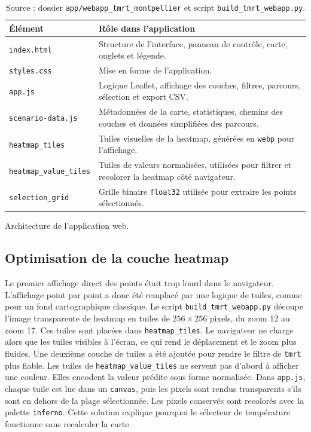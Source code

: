 \documentclass{article}
\begin{document}
\begin{table}[H]
\centering
\small
\begin{tabularx}{\textwidth}{p{}Y}
\toprule
Élément & Rôle dans l'application \\
\midrule
\texttt{index.html} & Structure de l'interface, panneau de contrôle, carte, onglets et légende. \\
\texttt{styles.css} & Mise en forme de l'application. \\
\texttt{app.js} & Logique Leaflet, affichage des couches, filtres, parcours, sélection et export CSV. \\
\texttt{scenario-data.js} & Métadonnées de la carte, statistiques, chemins des couches et données simplifiées des parcours. \\
\texttt{heatmap\_tiles} & Tuiles visuelles de la heatmap, générées en \texttt{webp} pour l'affichage. \\
\texttt{heatmap\_value\_tiles} & Tuiles de valeurs normalisées, utilisées pour filtrer et recolorer la heatmap côté navigateur. \\
\texttt{selection\_grid} & Grille binaire \texttt{float32} utilisée pour extraire les points sélectionnés. \\
\bottomrule
\end{tabularx}
\caption{Architecture de l'application web.}
\label{tab:webapp-architecture}
\vspace{-0.35cm}
\caption*{\footnotesize Source : dossier \texttt{app/webapp\_tmrt\_montpellier} et script \texttt{build\_tmrt\_webapp.py}.}
\end{table}

\subsection{Optimisation de la couche heatmap}

Le premier affichage direct des points était trop lourd dans le navigateur. L'affichage point par point a donc été remplacé par une logique de tuiles, comme pour un fond cartographique classique.
Le script \texttt{build\_tmrt\_webapp.py} découpe l'image transparente de heatmap en tuiles de \(256 \times 256\) pixels, du zoom 12 au zoom 17. Ces tuiles sont placées dans \texttt{heatmap\_tiles}. Le navigateur ne charge alors que les tuiles visibles à l'écran, ce qui rend le déplacement et le zoom plus fluides.
Une deuxième couche de tuiles a été ajoutée pour rendre le filtre de \texttt{tmrt} plus fiable. Les tuiles de \texttt{heatmap\_value\_tiles} ne servent pas d'abord à afficher une couleur. Elles encodent la valeur prédite sous forme normalisée. Dans \texttt{app.js}, chaque tuile est lue dans un \texttt{canvas}, puis les pixels sont rendus transparents s'ils sont en dehors de la plage sélectionnée. Les pixels conservés sont recolorés avec la palette \texttt{inferno}. Cette solution explique pourquoi le sélecteur de température fonctionne sans recalculer la carte.
\end{document}
